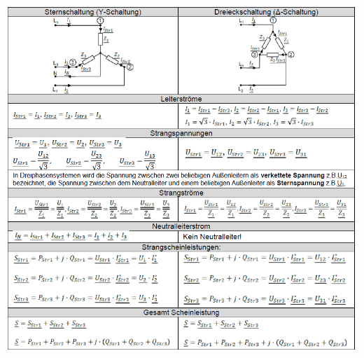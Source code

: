    \begin{minipage}[b]{\linewidth}
    	\includegraphics[scale = 0.8]{images/SternDreieck}
    \end{minipage}
    
    \clearpage
    \pagebreak
